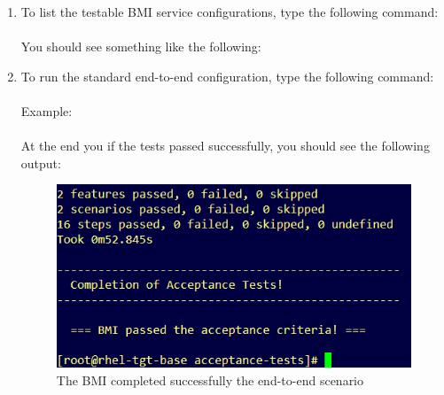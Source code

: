 \begin{enumerate}

\item  To list the testable BMI service configurations, type the following command: \\

 \\


You should see something like the following:


\item To run the standard end-to-end configuration, type the following command: \\

 \\

  Example: \\

 \\


At the end you if the tests passed successfully, you should see the following output: \\

\begin{figure}[!h] %
\begin{center}
\includegraphics[scale=0.7]{figures/bdd-bmi-passed-tests.png}
\end{center}
\caption{The BMI completed successfully the end-to-end scenario}
\label{fig:bdd-bmi-example-successful}
\end{figure}


\end{enumerate}
